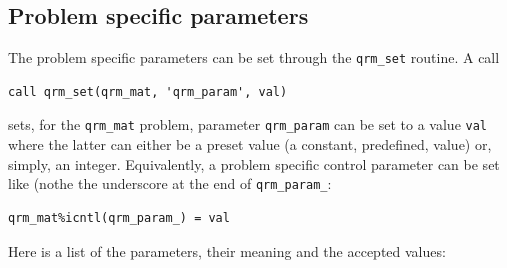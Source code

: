 \documentclass[11pt]{article}
\begin{document}
\subsection{Problem specific parameters}
\label{sec:lset}
The problem specific parameters can be set through the \texttt{qrm\_set}
routine. A call
\begin{lstlisting}
call qrm_set(qrm_mat, 'qrm_param', val)
\end{lstlisting}
sets, for the \texttt{qrm\_mat} problem, parameter \texttt{qrm\_param}
can be set to a value \texttt{val} where the latter can either be a
preset value (a constant, predefined, value) or, simply, an integer.
Equivalently, a problem specific control parameter can be set like
(nothe the underscore at the end of \texttt{qrm\_param\_}:
\begin{lstlisting}
qrm_mat%icntl(qrm_param_) = val
\end{lstlisting}

Here is a list of the parameters, their meaning and the accepted
values:
\end{document}
